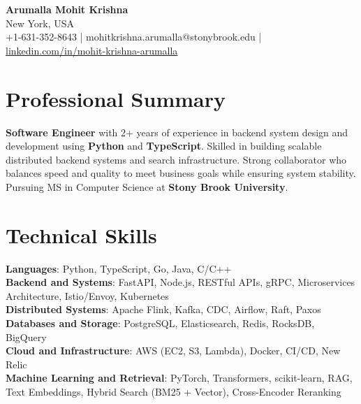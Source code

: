 \documentclass[letterpaper,11pt]{article}
\begin{document}
\begin{center}
  {\Large \textbf{Arumalla Mohit Krishna}} \\
  New York, USA \\
  +1-631-352-8643 \enspace | \enspace mohitkrishna.arumalla@stonybrook.edu \enspace | \enspace \href{https://www.linkedin.com/in/mohit-krishna-arumalla}{linkedin.com/in/mohit-krishna-arumalla}
\end{center}

\section{Professional Summary}
  \begin{itemize}[leftmargin=0.15in, label={}]
    \small{\item{
     \textbf{Software Engineer} with 2+ years of experience in backend system design and development using \textbf{Python} and \textbf{TypeScript}. Skilled in building scalable distributed backend systems and search infrastructure. Strong collaborator who balances speed and quality to meet business goals while ensuring system stability. Pursuing MS in Computer Science at \textbf{Stony Brook University}.
    }}
  \end{itemize}
\vspace{-16pt}

\section{Technical Skills}
 \begin{itemize}[leftmargin=0.15in, label={}]
    \small{\item{
     \textbf{Languages}: Python, TypeScript, Go, Java, C/C++ \\
     \textbf{Backend and Systems}: FastAPI, Node.js, RESTful APIs, gRPC, Microservices Architecture, Istio/Envoy, Kubernetes \\
     \textbf{Distributed Systems}: Apache Flink, Kafka, CDC, Airflow, Raft, Paxos \\
     \textbf{Databases and Storage}: PostgreSQL, Elasticsearch, Redis, RocksDB, BigQuery \\
     \textbf{Cloud and Infrastructure}: AWS (EC2, S3, Lambda), Docker, CI/CD, New Relic \\
     \textbf{Machine Learning and Retrieval}: PyTorch, Transformers, scikit-learn, RAG, Text Embeddings, Hybrid Search (BM25 + Vector), Cross-Encoder Reranking
    }}
 \end{itemize}
\vspace{-16pt}
\end{document}
